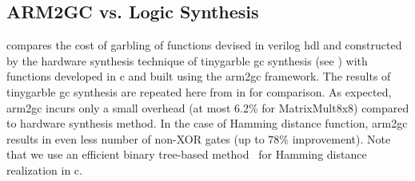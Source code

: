 \subsection{ARM2GC vs. Logic Synthesis}
 compares the cost of garbling of functions devised in \gls{verilog} \acrshort{hdl} and constructed by the hardware synthesis technique of \gls{tinygarble} \acrshort{gc} synthesis (see ) with functions developed in \gls{c} and built using the \gls{arm2gc} framework.
The results of \gls{tinygarble} \acrshort{gc} synthesis are repeated here from  in  for comparison.
As expected, \gls{arm2gc} incurs only a small overhead (at most 6.2\% for MatrixMult8x8) compared to hardware synthesis method.
In the case of Hamming distance function, \gls{arm2gc} results in even less number of non-XOR gates (up to $78\%$ improvement).
Note that we use an efficient binary tree-based method~\cite{huang2011faster} for Hamming distance realization in \gls{c}.

